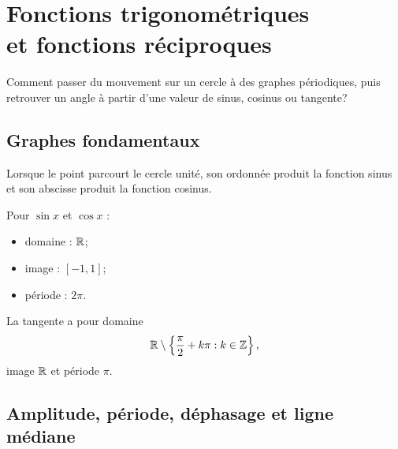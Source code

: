 \chapter[Fonctions trigonométriques et fonctions réciproques]{Fonctions trigonométriques\\et fonctions réciproques}
\label{manual:chapter:16}

\begin{questionbox}
Comment passer du mouvement sur un cercle à des graphes périodiques, puis retrouver un angle à partir d'une valeur de sinus, cosinus ou tangente?
\end{questionbox}

\section{Graphes fondamentaux}
\label{manual:section:16.01}

Lorsque le point parcourt le cercle unité, son ordonnée produit la fonction sinus et son abscisse produit la fonction cosinus.

\begin{center}
\end{center}

Pour $\sin x$ et $\cos x$ :
\begin{itemize}
\item domaine : $\mathbb{R}$;
\item image : $[-1,1]$;
\item période : $2\pi$.
\end{itemize}
La tangente a pour domaine
\[
\mathbb{R}\setminus\left\{\frac\pi2+k\pi:k\in\mathbb{Z}\right\},
\]
image $\mathbb{R}$ et période $\pi$.

\section{Amplitude, période, déphasage et ligne médiane}
\label{manual:section:16.02}

